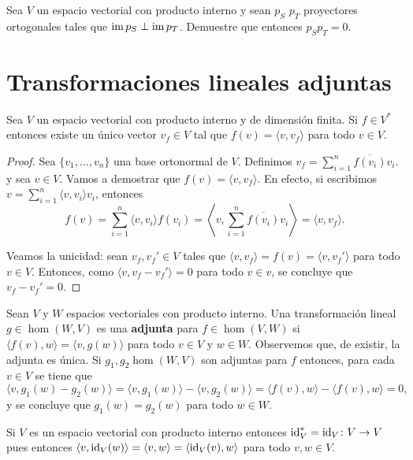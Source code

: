 \begin{xca}
	\label{xca:pSpT}
	Sea $V$ un espacio vectorial con producto interno y sean $p_S$ $p_T$
	proyectores ortogonales tales que $\operatorname{im} p_S\perp\operatorname{im} p_T$. Demuestre que
	entonces $p_Sp_T=0$. 
\end{xca}

\section{Transformaciones lineales adjuntas}

\begin{thm}
	\label{thm:interno:Riesz}
	Sea $V$ un espacio vectorial con producto interno y de dimensión finita.  Si
	$f\in V^*$ entonces existe un único vector $v_f\in V$ tal que $f(v)=\langle
	v,v_f\rangle$ para todo $v\in V$.

	\begin{proof}
		Sea $\{v_1,\dots,v_n\}$ una base ortonormal de $V$. Definimos
		$v_f=\sum_{i=1}^n\overline{f(v_i)}v_i$. y sea $v\in V$. Vamos a
		demostrar que $f(v)=\langle v,v_f\rangle$. En efecto, si escribimos
		$v=\sum_{i=1}^n\langle v,v_i\rangle v_i$, entonces 
		\[
		f(v)=\sum_{i=1}^n\langle v,v_i\rangle f(v_i)=\left\langle v,\sum_{i=1}^n\overline{f(v_i)}v_i\right\rangle=\langle v,v_f\rangle.
		\]

		Veamos la unicidad: sean $v_f,v_f'\in V$ tales que $\langle
		v,v_f\rangle=f(v)=\langle v,v_f'\rangle$ para todo $v\in V$. Entonces, como 
		$\langle v,v_f-v_f'\rangle=0$ para todo $v\in v$, se concluye que $v_f-v_f'=0$. 
	\end{proof}
\end{thm}

\begin{block}
    Sean $V$ y $W$ espacios vectoriales con producto interno. Una
    transformación lineal $g\in\hom(W,V)$ es una \textbf{adjunta} para
    $f\in\hom(V,W)$ si $\langle f(v),w\rangle=\langle v,g(w)\rangle$ para todo
    $v\in V$ y $w\in W$. Observemos que, de existir, la adjunta es única. Si
    $g_1,g_2\hom(W,V)$ son adjuntas para $f$ entonces, para cada $v\in V$
    se tiene que 
	\[
		\langle v,g_1(w)-g_2(w)\rangle=\langle v,g_1(w)\rangle-\langle v,g_2(w)\rangle=\langle f(v),w\rangle-\langle f(v),w\rangle=0,
	\]
	y se concluye que $g_1(w)=g_2(w)$ para todo $w\in W$. 
\end{block}

\begin{example}
	Si $V$ es un espacio vectorial con producto interno entonces
	$\operatorname{id}_V^*=\operatorname{id}_V\colon V\to V$ pues entonces $\langle
	v,\operatorname{id}_V(w)\rangle=\langle v,w\rangle=\langle \operatorname{id}_V(v),w\rangle$ para todo
	$v,w\in V$.
\end{example}

